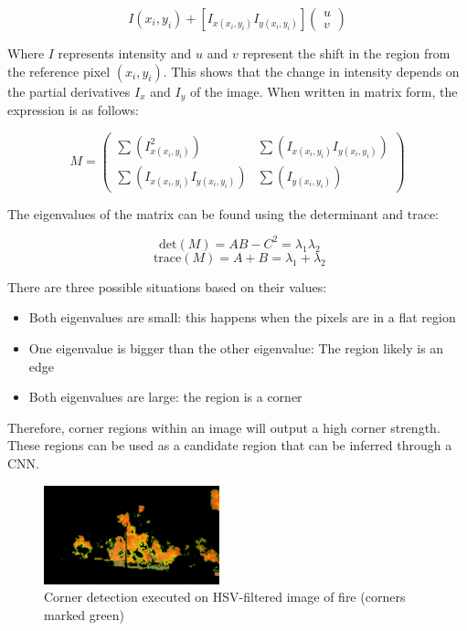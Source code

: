\documentclass[lettersize,journal]{IEEEtran}
\begin{document}
\[I\left( x_{i},y_{i} \right) + \left\lbrack I_{x\left( x_{i},y_{i} \right)}I_{y\left( x_{i},y_{i} \right)} \right\rbrack\begin{pmatrix}
u \\
v
\end{pmatrix}\]

Where \(I\) represents intensity and \(u\) and \(v\) represent the shift
in the region from the reference pixel \(\left( x_{i},y_{i} \right)\).
This shows that the change in intensity depends on the partial
derivatives \(I_{x}\) and \(I_{y}\) of the image. When written in matrix
form, the expression is as follows:

\[M = \begin{pmatrix}
\sum(I_{x\left( x_{i},y_{i} \right)}^{2}) & \sum(I_{x\left( x_{i},y_{i} \right)}I_{y\left( x_{i},y_{i} \right)}) \\
\sum(I_{x\left( x_{i},y_{i} \right)}I_{y\left( x_{i},y_{i} \right)}) & \sum(I_{y\left( x_{i},y_{i} \right)})
\end{pmatrix}\]

The eigenvalues of the matrix can be found using the determinant and
trace:

\[\text{ det}(M) = AB - C^{2} = \lambda_{1}\lambda_{2}\]
\[\text{ trace}(M) = A + B = \lambda_{1} + \lambda_{2}\]

There are three possible situations based on their values:

\begin{itemize}
\item
  Both eigenvalues are small: this happens when the pixels are in a flat
  region
\item
  One eigenvalue is bigger than the other eigenvalue: The region likely
  is an edge
\item
  Both eigenvalues are large: the region is a corner
\end{itemize}

Therefore, corner regions within an image will output a high corner
strength. These regions can be used as a candidate region that can be
inferred through a CNN.

\begin{figure}
        \centering
        \includegraphics[width=2in]{corner.png}
        \caption{Corner detection executed on HSV-filtered image of fire
        (corners marked green)}
        \label{corner}
\end{figure}
\end{document}
